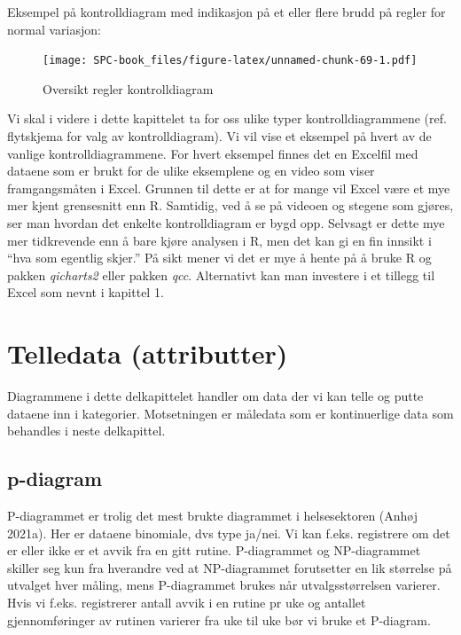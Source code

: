 \documentclass[
]{book}
\begin{document}
Eksempel på kontrolldiagram med indikasjon på et eller flere brudd på regler for normal variasjon:

\begin{figure}
\centering
\texttt{[image: SPC-book\_files/figure-latex/unnamed-chunk-69-1.pdf]}
\caption{\label{fig:unnamed-chunk-69}Oversikt regler kontrolldiagram}
\end{figure}

Vi skal i videre i dette kapittelet ta for oss ulike typer kontrolldiagrammene (ref. flytskjema for valg av kontrolldiagram). Vi vil vise et eksempel på hvert av de vanlige kontrolldiagrammene. For hvert eksempel finnes det en Excelfil med dataene som er brukt for de ulike eksemplene og en video som viser framgangsmåten i Excel. Grunnen til dette er at for mange vil Excel være et mye mer kjent grensesnitt enn R. Samtidig, ved å se på videoen og stegene som gjøres, ser man hvordan det enkelte kontrolldiagram er bygd opp. Selvsagt er dette mye mer tidkrevende enn å bare kjøre analysen i R, men det kan gi en fin innsikt i ``hva som egentlig skjer.'' På sikt mener vi det er mye å hente på å bruke R og pakken \emph{qicharts2} eller pakken \emph{qcc}. Alternativt kan man investere i et tillegg til Excel som nevnt i kapittel 1.

\hypertarget{telledata-attributter}{%
\section{Telledata (attributter)}\label{telledata-attributter}}

Diagrammene i dette delkapittelet handler om data der vi kan telle og putte dataene inn i kategorier. Motsetningen er måledata som er kontinuerlige data som behandles i neste delkapittel.

\hypertarget{p-diagram}{%
\subsection{p-diagram}\label{p-diagram}}

P-diagrammet er trolig det mest brukte diagrammet i helsesektoren (Anhøj 2021a). Her er dataene binomiale, dvs type ja/nei. Vi kan f.eks. registrere om det er eller ikke er et avvik fra en gitt rutine. P-diagrammet og NP-diagrammet skiller seg kun fra hverandre ved at NP-diagrammet forutsetter en lik størrelse på utvalget hver måling, mens P-diagrammet brukes når utvalgsstørrelsen varierer. Hvis vi f.eks. registrerer antall avvik i en rutine pr uke og antallet gjennomføringer av rutinen varierer fra uke til uke bør vi bruke et P-diagram.
\end{document}
